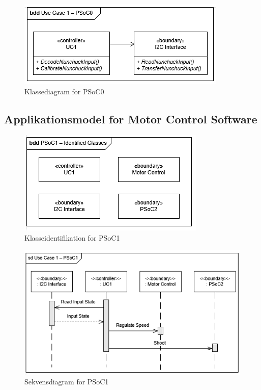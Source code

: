 \begin{figure}[H]
	\centering
	\includegraphics[scale=0.8]{Systemarkitektur/images/klasseUC1PSoC0}
	\caption{Klassediagram for PSoC0}
	\label{fig:klasseUC1PSoC0}
\end{figure}

\subsection{Applikationsmodel for Motor Control Software}

\begin{figure}[H]
	\centering
	\includegraphics[scale=0.8]{Systemarkitektur/images/klasseIdentificationUC1PSoC1}
	\caption{Klasseidentifikation for PSoC1}
	\label{fig:klasseidentifikationUC1PSoC1}
\end{figure}

\begin{figure}[H]
	\centering
	\includegraphics[scale=0.8]{Systemarkitektur/images/UC1PSoC1SequenceDiagram}
	\caption{Sekvensdiagram for PSoC1}
	\label{fig:sekvensUC1PSoC1}
\end{figure}

